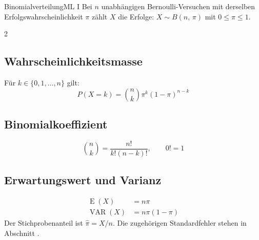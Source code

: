 \begin{formulaBox}{Binomialverteilung}{ML I}
Bei $n$ unabhängigen Bernoulli-Versuchen mit derselben
Erfolgswahrscheinlichkeit $\pi$ zählt $X$ die Erfolge:
$X\sim B(n,\,\pi)$ mit $0\leq\pi\leq1$.

\begin{multicols}{2}
\subsection*{Wahrscheinlichkeitsmasse}
Für $k\in\{0,1,\dots,n\}$ gilt:
\[
P(X=k)=\binom{n}{k}\pi^k(1-\pi)^{n-k}
\]

\subsection*{Binomialkoeffizient}
\[
\binom{n}{k}=\frac{n!}{k!(n-k)!},\qquad 0!=1
\]

\columnbreak
\subsection*{Erwartungswert und Varianz}
\begin{align*}
\operatorname{E}(X)&=n\pi\\
\operatorname{VAR}(X)&=n\pi(1-\pi)
\end{align*}
Der Stichprobenanteil ist $\hat{\pi}=X/n$.
Die zugehörigen Standardfehler stehen in Abschnitt
.
\end{multicols}
\end{formulaBox}
